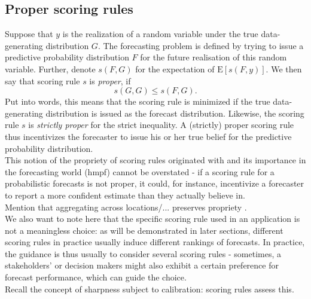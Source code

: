 \subsection{Proper scoring rules}
Suppose that $y$ is the realization of a random variable under the true data-generating distribution $G$. The forecasting problem is defined by trying to issue a predictive probability distribution $F$ for the future realisation of this random variable. Further, denote $s(F,G)$ for the expectation of $\text{E}[s(F,y)]$. We then say that scoring rule $s$ is \textit{proper}, if 
\[s(G,G) \leq s(F,G).\]
Put into words, this means that the scoring rule is minimized if the true data-generating distribution is issued as the forecast distribution. Likewise, the scoring rule $s$ is \textit{strictly proper} for the strict inequality.
A (strictly) proper scoring rule thus incentivizes the forecaster to issue his or her true belief for the predictive probability distribution.\\
This notion of the propriety of scoring rules originated with  and its importance in the forecasting world (hmpf) cannot be overstated - if a scoring rule for a probabilistic forecasts is not proper, it could, for instance, incentivize a forecaster to report a more confident estimate than they actually believe in.\\
Mention that aggregating across locations/... preserves propriety \citep{bracher_evaluating_2021}.\\
We also want to note here that the specific scoring rule used in an application is not a meaningless choice: as will be demonstrated in later sections, different scoring rules in practice usually induce different rankings of forecasts. In practice, the guidance is thus usually to consider several scoring rules - sometimes, a stakeholders' or decision makers might also exhibit a certain preference for forecast performance, which can guide the choice.\\
Recall the concept of sharpness subject to calibration: scoring rules assess this.
